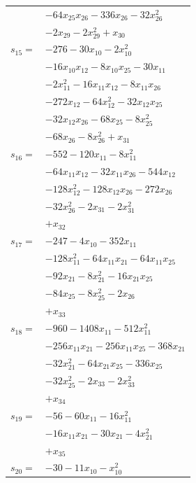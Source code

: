 \begin{longtable}{@{}r@{\;}l@{}}
 & \(\displaystyle -64x_{25}x_{26} -336x_{26} -32x_{26}^{2}\) \\
 & \(\displaystyle -2x_{29} -2x_{29}^{2} +x_{30}\) \\[3pt]
\(s_{15}=\) & \(\displaystyle -276 -30x_{10} -2x_{10}^{2}\) \\
 & \(\displaystyle -16x_{10}x_{12} -8x_{10}x_{25} -30x_{11}\) \\
 & \(\displaystyle -2x_{11}^{2} -16x_{11}x_{12} -8x_{11}x_{26}\) \\
 & \(\displaystyle -272x_{12} -64x_{12}^{2} -32x_{12}x_{25}\) \\
 & \(\displaystyle -32x_{12}x_{26} -68x_{25} -8x_{25}^{2}\) \\
 & \(\displaystyle -68x_{26} -8x_{26}^{2} +x_{31}\) \\[3pt]
\(s_{16}=\) & \(\displaystyle -552 -120x_{11} -8x_{11}^{2}\) \\
 & \(\displaystyle -64x_{11}x_{12} -32x_{11}x_{26} -544x_{12}\) \\
 & \(\displaystyle -128x_{12}^{2} -128x_{12}x_{26} -272x_{26}\) \\
 & \(\displaystyle -32x_{26}^{2} -2x_{31} -2x_{31}^{2}\) \\
 & \(\displaystyle +x_{32}\) \\[3pt]
\(s_{17}=\) & \(\displaystyle -247 -4x_{10} -352x_{11}\) \\
 & \(\displaystyle -128x_{11}^{2} -64x_{11}x_{21} -64x_{11}x_{25}\) \\
 & \(\displaystyle -92x_{21} -8x_{21}^{2} -16x_{21}x_{25}\) \\
 & \(\displaystyle -84x_{25} -8x_{25}^{2} -2x_{26}\) \\
 & \(\displaystyle +x_{33}\) \\[3pt]
\(s_{18}=\) & \(\displaystyle -960 -1408x_{11} -512x_{11}^{2}\) \\
 & \(\displaystyle -256x_{11}x_{21} -256x_{11}x_{25} -368x_{21}\) \\
 & \(\displaystyle -32x_{21}^{2} -64x_{21}x_{25} -336x_{25}\) \\
 & \(\displaystyle -32x_{25}^{2} -2x_{33} -2x_{33}^{2}\) \\
 & \(\displaystyle +x_{34}\) \\[3pt]
\(s_{19}=\) & \(\displaystyle -56 -60x_{11} -16x_{11}^{2}\) \\
 & \(\displaystyle -16x_{11}x_{21} -30x_{21} -4x_{21}^{2}\) \\
 & \(\displaystyle +x_{35}\) \\[3pt]
\(s_{20}=\) & \(\displaystyle -30 -11x_{10} -x_{10}^{2}\) \\

\end{longtable}
